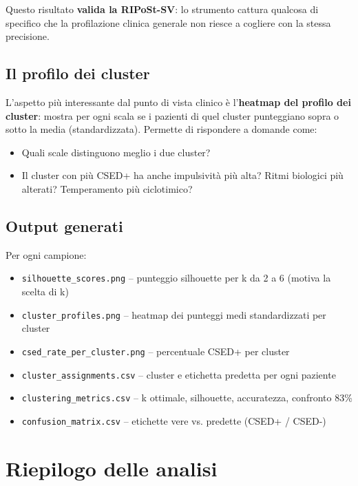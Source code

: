 \documentclass[12pt, a4paper]{article}
\begin{document}
Questo risultato \textbf{valida la RIPoSt-SV}: lo strumento cattura qualcosa di specifico
che la profilazione clinica generale non riesce a cogliere con la stessa precisione.

\subsection{Il profilo dei cluster}

L'aspetto più interessante dal punto di vista clinico è l'\textbf{heatmap del profilo dei
cluster}: mostra per ogni scala se i pazienti di quel cluster punteggiano sopra o sotto la
media (standardizzata). Permette di rispondere a domande come:
\begin{itemize}
    \item Quali scale distinguono meglio i due cluster?
    \item Il cluster con più CSED+ ha anche impulsività più alta? Ritmi biologici più alterati?
          Temperamento più ciclotimico?
\end{itemize}

\subsection{Output generati}

Per ogni campione:
\begin{itemize}
    \item \texttt{silhouette\_scores.png} -- punteggio silhouette per k da 2 a 6 (motiva la
          scelta di k)
    \item \texttt{cluster\_profiles.png} -- heatmap dei punteggi medi standardizzati per cluster
    \item \texttt{csed\_rate\_per\_cluster.png} -- percentuale CSED+ per cluster
    \item \texttt{cluster\_assignments.csv} -- cluster e etichetta predetta per ogni paziente
    \item \texttt{clustering\_metrics.csv} -- k ottimale, silhouette, accuratezza, confronto 83\%
    \item \texttt{confusion\_matrix.csv} -- etichette vere vs. predette (CSED+ / CSED-)
\end{itemize}

\section{Riepilogo delle analisi}
\end{document}
